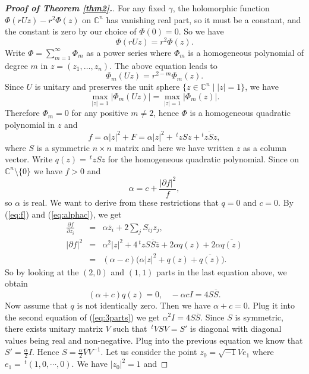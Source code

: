 \documentclass{amsart}
\numberwithin{equation}{section}
\begin{document}
\begin{proof}[{\bf Proof of Theorem \ref{thm2}.}]
For any fixed $\gamma$,  the holomorphic function $\Phi(rUz)-r^2\Phi (z)$ on ${\mathbb C}^n$ has vanishing real part, so it must be a constant, and the constant is zero by our choice of $\Phi (0)=0$. So we have
$$ \Phi (rUz) = r^2 \Phi (z). $$
Write $\Phi = \sum_{m=1}^{\infty } \Phi_m$ as a power series where $\Phi_m$ is a homogeneous polynomial of degree $m$ in $z=(z_1, \ldots , z_n)$.  The above equation leads to
$$ \Phi_m (Uz) = r^{2-m}\Phi_m (z). $$
Since $U$ is unitary and preserves the unit sphere $\{ z\in {\mathbb C}^n \mid |z|=1\}$, we have
$$  \max_{|z|=1} |\Phi_m(Uz)| = \max_{|z|=1} |\Phi_m (z)|. $$
Therefore $\Phi_m=0$ for any positive $m\neq 2$, hence $\Phi$ is a homogeneous quadratic polynomial in $z$ and
\begin{equation}  \label{eq:f}
f = \alpha |z|^2 + F = \alpha |z|^2 + \,^t\!zSz + \overline{^t\!zSz},
\end{equation}
where $S$ is a symmetric $n\times n$ matrix and here we have written $z$ as a column vector. Write $q(z)=\,^t\!zSz$ for the homogeneous quadratic polynomial. Since  on ${\mathbb C}^n\setminus \{0\}$ we have $f>0$ and
\begin{equation} \label{eq:alphac}
 \alpha = c+ \frac{|\partial f|^2 }{f},
\end{equation}
so $\alpha$ is real. We want to derive from these restrictions that $q=0$ and $c=0$. By (\ref{eq:f}) and (\ref{eq:alphac}), we get
\begin{eqnarray*}
 \frac{\partial f}{\partial z_i} &= & \alpha \overline{z}_i + 2\sum_j S_{ij}z_j, \\
 |\partial f|^2 & =&  \alpha^2|z|^2  + 4\,^t\!zS\overline{S}\overline{z} + 2\alpha q(z) + 2 \alpha \overline{q(z)} \\
&=&  (\alpha -c)\big( \alpha |z|^2 + q(z) + \overline{q(z)} \big).
 \end{eqnarray*}
So by looking at the $(2,0)$ and $(1,1)$ parts in the last equation above, we obtain
\begin{equation} \label{eq:3parts}
(\alpha +c)q(z)=0, \ \  \ \ -\alpha c I = 4 S \overline{S}.
\end{equation}
Now assume that $q$ is not identically zero. Then we have $\alpha +c=0$. Plug it into the second equation of (\ref{eq:3parts}) we get $\alpha^2I=4S\overline{S}$. Since $S$ is symmetric, there exists unitary matrix $V$ such that $\,^t\!VSV=S'$ is diagonal with diagonal values being real and non-negative. Plug into the previous equation we know that $S'=\frac{\alpha}{2}I$. Hence $S=\frac{\alpha}{2} \overline{V} V^{-1}$. Let us consider the point $z_0=\sqrt{-1}Ve_1$ where $e_1=\,^t\!(1, 0, \cdots , 0)$. We have $|z_0|^2=1$ and

\end{proof}
\end{document}
